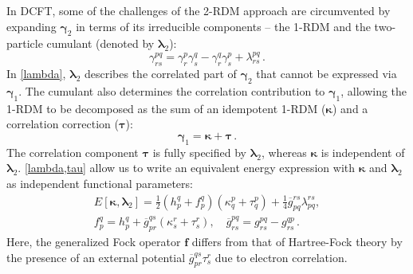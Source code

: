 In DCFT, some of the challenges of the 2-RDM approach are circumvented by
expanding $\boldsymbol{\gamma}_2$ in terms of its irreducible components -- the 1-RDM and
the two-particle cumulant (denoted by $\boldsymbol{\lambda}_2$):
\begin{equation}
	\label{lambda}
	\gamma_{rs}^{pq}
    =
	\gamma_r^p
    \gamma_s^q
    -
    \gamma_r^q
    \gamma_s^p
	+
    \lambda_{rs}^{pq}\,.
\end{equation}
In \cref{lambda}, $\boldsymbol{\lambda}_2$ describes the correlated part of $\boldsymbol{\gamma}_2$ that
cannot be expressed via $\boldsymbol{\gamma}_1$. The cumulant also determines the correlation
contribution to $\boldsymbol{\gamma}_1$, allowing the 1-RDM to be decomposed as the sum of an
idempotent 1-RDM ($\boldsymbol{\kappa}$) and a correlation correction ($\boldsymbol{\tau}$):
\begin{equation}
	\label{tau}
	\boldsymbol{\gamma}_1
    =
    \boldsymbol{\kappa}
    +
    \boldsymbol{\tau}\,.
\end{equation}
The correlation component $\boldsymbol{\tau}$ is fully specified by $\boldsymbol{\lambda}_2$, whereas
$\boldsymbol{\kappa}$ is independent of $\boldsymbol{\lambda}_2$. \cref{lambda,tau} allow us to write an
equivalent energy expression with $\boldsymbol{\kappa}$ and $\boldsymbol{\lambda}_2$ as independent
functional parameters:
\begin{equation}
	\label{e-dcft}
    \begin{array}{c}
        E[\boldsymbol{\kappa},\boldsymbol{\lambda}_2]
        =
        \tfrac{1}{2}
        (h_p^q+f_p^q)
        (\kappa_q^p+\tau_q^p)
        +
        \tfrac{1}{4}
        \overline{g}_{pq}^{rs}
        \lambda_{pq}^{rs}
        ,
        \\
        f_p^q
        =
        h_p^q
        +
        \overline{g}_{pr}^{qs}
        (\kappa_s^r+\tau_s^r)
        ,
        \quad
        \overline{g}_{rs}^{pq}
        =
        g_{rs}^{pq}
        -
        g_{rs}^{qp}\,.
    \end{array}
\end{equation}
Here, the generalized Fock operator $\boldsymbol{f}$ differs from that of
Hartree-Fock theory by the presence of an external potential
$\overline{g}_{pr}^{qs}\tau_s^r$ due to electron
correlation.\cite{Kutzelnigg:2006p171101}


